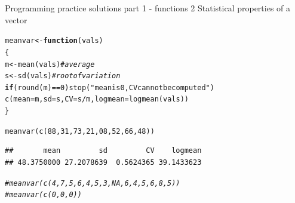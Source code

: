 \documentclass[xcolor=table,       handout,    xcolor=dvipsnames]{beamer}\usepackage[]{graphicx}\usepackage[]{color}
\makeatletter
\newcommand{\hlnum}[1]{\textcolor[rgb]{0,0,0}{#1}}
\newcommand{\hlstr}[1]{\textcolor[rgb]{0.545,0.137,0.137}{#1}}
\newcommand{\hlcom}[1]{\textcolor[rgb]{0,0.392,0}{\textit{#1}}}
\newcommand{\hlopt}[1]{\textcolor[rgb]{0,0,0}{#1}}
\newcommand{\hlstd}[1]{\textcolor[rgb]{0,0,0}{#1}}
\newcommand{\hlkwa}[1]{\textcolor[rgb]{1,0,0}{\textbf{#1}}}
\newcommand{\hlkwb}[1]{\textcolor[rgb]{0,0,0}{#1}}
\newcommand{\hlkwc}[1]{\textcolor[rgb]{1,0,1}{#1}}
\newcommand{\hlkwd}[1]{\textcolor[rgb]{0,0,1}{#1}}
\newenvironment{kframe}{%
 \def\at@end@of@kframe{}%
 \ifinner\ifhmode%
  \def\at@end@of@kframe{\end{minipage}}%
  \begin{minipage}{\columnwidth}%
 \fi\fi%
 \def\FrameCommand##1{\hskip\@totalleftmargin \hskip-\fboxsep
 \colorbox{shadecolor}{##1}\hskip-\fboxsep
     \hskip-\linewidth \hskip-\@totalleftmargin \hskip\columnwidth}%
 \MakeFramed {\advance\hsize-\width
   \@totalleftmargin\z@ \linewidth\hsize
   \@setminipage}}%
 {\par\unskip\endMakeFramed%
 \at@end@of@kframe}
\newenvironment{knitrout}{}{} %
\makeatother
\begin{document}
\begin{frame}[fragile]{Programming practice solutions part 1 - functions 2}
Statistical properties of a vector
\begin{knitrout}
\color{fgcolor}\begin{kframe}
\begin{alltt}
\hlstd{meanvar} \hlkwb{<-} \hlkwa{function}\hlstd{(}\hlkwc{vals}\hlstd{)}
  \hlstd{\{}
  \hlstd{m} \hlkwb{<-} \hlkwd{mean}\hlstd{(vals)} \hlcom{# average}
  \hlstd{s} \hlkwb{<-} \hlkwd{sd}\hlstd{(vals)} \hlcom{# root of variation}
  \hlkwa{if}\hlstd{(}\hlkwd{round}\hlstd{(m)}\hlopt{==}\hlnum{0}\hlstd{)} \hlkwd{stop}\hlstd{(}\hlstr{"mean is 0, CV cannot be computed"}\hlstd{)}
  \hlkwd{c}\hlstd{(}\hlkwc{mean}\hlstd{=m,} \hlkwc{sd}\hlstd{=s,} \hlkwc{CV}\hlstd{=s}\hlopt{/}\hlstd{m,} \hlkwc{logmean}\hlstd{=}\hlkwd{logmean}\hlstd{(vals))}
  \hlstd{\}}

\hlkwd{meanvar}\hlstd{(}\hlkwd{c}\hlstd{(}\hlnum{88}\hlstd{,}\hlnum{31}\hlstd{,}\hlnum{73}\hlstd{,}\hlnum{21}\hlstd{,}\hlnum{08}\hlstd{,}\hlnum{52}\hlstd{,}\hlnum{66}\hlstd{,}\hlnum{48}\hlstd{))}
\end{alltt}
\begin{verbatim}
##       mean         sd         CV    logmean 
## 48.3750000 27.2078639  0.5624365 39.1433623
\end{verbatim}
\begin{alltt}
\hlcom{#meanvar(c(4,7,5,6,4,5,3,NA,6,4,5,6,8,5))}
\hlcom{#meanvar(c(0,0,0))}
\end{alltt}
\end{kframe}
\end{knitrout}
\end{frame}

\end{document}
